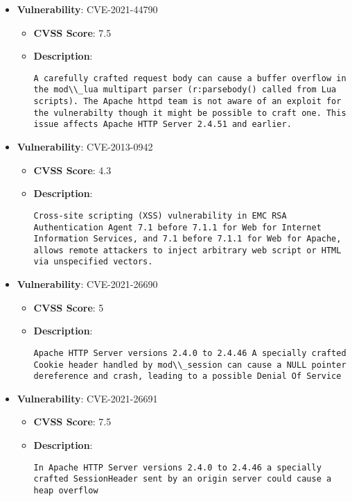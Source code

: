 \documentclass{article}
\begin{document}
\begin{itemize}
        \item \textbf{Vulnerability}: CVE-2021-44790
        \begin{itemize}
            \item \textbf{CVSS Score}:  7.5 
            \item \textbf{Description}:
            \parbox[t]{0.9\linewidth}{
                \verb|A carefully crafted request body can cause a buffer overflow in the mod\\_lua multipart parser (r:parsebody() called from Lua scripts). The Apache httpd team is not aware of an exploit for the vulnerabilty though it might be possible to craft one. This issue affects Apache HTTP Server 2.4.51 and earlier.|
            }
        \end{itemize}
    
        \item \textbf{Vulnerability}: CVE-2013-0942
        \begin{itemize}
            \item \textbf{CVSS Score}:  4.3 
            \item \textbf{Description}:
            \parbox[t]{0.9\linewidth}{
                \verb|Cross-site scripting (XSS) vulnerability in EMC RSA Authentication Agent 7.1 before 7.1.1 for Web for Internet Information Services, and 7.1 before 7.1.1 for Web for Apache, allows remote attackers to inject arbitrary web script or HTML via unspecified vectors.|
            }
        \end{itemize}
    
        \item \textbf{Vulnerability}: CVE-2021-26690
        \begin{itemize}
            \item \textbf{CVSS Score}:  5 
            \item \textbf{Description}:
            \parbox[t]{0.9\linewidth}{
                \verb|Apache HTTP Server versions 2.4.0 to 2.4.46 A specially crafted Cookie header handled by mod\\_session can cause a NULL pointer dereference and crash, leading to a possible Denial Of Service|
            }
        \end{itemize}
    
        \item \textbf{Vulnerability}: CVE-2021-26691
        \begin{itemize}
            \item \textbf{CVSS Score}:  7.5 
            \item \textbf{Description}:
            \parbox[t]{0.9\linewidth}{
                \verb|In Apache HTTP Server versions 2.4.0 to 2.4.46 a specially crafted SessionHeader sent by an origin server could cause a heap overflow|
            }
        \end{itemize}
    

\end{itemize}
\end{document}
